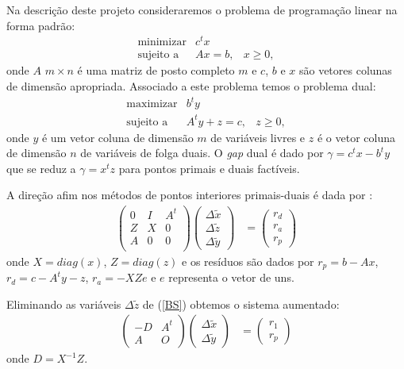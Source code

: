 \documentclass[12pt]{article}
\begin{document}
Na descrição deste projeto consideraremos o problema de programação linear na
forma padrão:
\begin{displaymath}
\begin{array}{lll}
\mbox{minimizar} & c^tx & \\
\mbox{sujeito a} & Ax = b, & x \ge 0,
\end{array}
\end{displaymath}
onde $A$ $m \times n$  é uma matriz de posto completo $m$
e $c$, $b$ e $x$ são vetores colunas de dimensão apropriada.
Associado a este problema temos o problema dual:
\begin{displaymath}
\begin{array}{lll}
\mbox{maximizar} & b^ty &\\
\mbox{sujeito a} & A^ty + z = c, & z \ge 0,
\end{array}
\end{displaymath}
onde $y$ é um vetor coluna de dimensão $m$ de variáveis livres e $z$ é o vetor
coluna de dimensão $n$ de variáveis de folga duais. O {\it gap} dual é
dado por $\gamma= c^tx - b^ty$ que se reduz a $\gamma= x^tz$ para
pontos primais e duais factíveis.

A direção afim nos métodos de pontos interiores primais-duais é dada por
\cite{MAR90,Wr96}:
\begin{eqnarray} \label{BS}
\left(\begin{array}{llc}
0 & I & A^{t}\\
Z & X & 0\\
A & 0 & 0\\
\end{array} \right)
\left(\begin{array}{r}
\Delta \tilde{x}\\
\Delta \tilde{z}\\
\Delta \tilde{y}
\end{array} \right) &=
\left(\begin{array}{c}
r_d\\
r_a\\
r_p
\end{array} \right)
\end{eqnarray}
onde $X = diag(x)$, $Z = diag(z)$ e os resíduos são dados por $r_p = b - Ax$,
$r_d = c - A^ty - z$, $r_a = -XZe$ e $e$ representa o vetor de uns.

Eliminando as variáveis $\Delta \tilde{z}$ de (\ref{BS}) obtemos o sistema
aumentado:
\begin{eqnarray} \label{GAS}
\left(\begin{array}{rc}
-D & A^t\\
 A & O
\end{array} \right)
\left(\begin{array}{r}
\Delta \tilde{x}\\
\Delta \tilde{y}
\end{array} \right) &=
\left(\begin{array}{c}
r_1\\
r_p
\end{array} \right)
\end{eqnarray}
onde $D = X^{-1}Z$.\\
\end{document}
